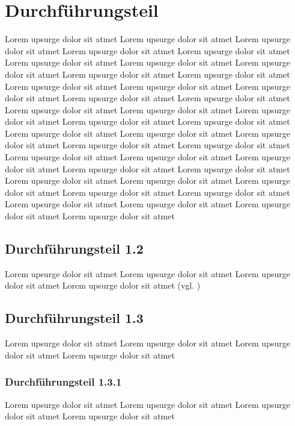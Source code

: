 \section{Durchführungsteil}

Lorem upsurge dolor sit atmet Lorem upsurge dolor sit atmet Lorem upsurge dolor sit atmet Lorem upsurge dolor sit atmet Lorem upsurge dolor sit atmet Lorem upsurge dolor sit atmet Lorem upsurge dolor sit atmet Lorem upsurge dolor sit atmet Lorem upsurge dolor sit atmet Lorem upsurge dolor sit atmet Lorem upsurge dolor sit atmet Lorem upsurge dolor sit atmet Lorem upsurge dolor sit atmet Lorem upsurge dolor sit atmet Lorem upsurge dolor sit atmet Lorem upsurge dolor sit atmet Lorem upsurge dolor sit atmet Lorem upsurge dolor sit atmet Lorem upsurge dolor sit atmet Lorem upsurge dolor sit atmet Lorem upsurge dolor sit atmet Lorem upsurge dolor sit atmet Lorem upsurge dolor sit atmet Lorem upsurge dolor sit atmet Lorem upsurge dolor sit atmet Lorem upsurge dolor sit atmet Lorem upsurge dolor sit atmet Lorem upsurge dolor sit atmet Lorem upsurge dolor sit atmet Lorem upsurge dolor sit atmet Lorem upsurge dolor sit atmet Lorem upsurge dolor sit atmet Lorem upsurge dolor sit atmet Lorem upsurge dolor sit atmet Lorem upsurge dolor sit atmet Lorem upsurge dolor sit atmet Lorem upsurge dolor sit atmet Lorem upsurge dolor sit atmet Lorem upsurge dolor sit atmet 

\subsection{Durchführungsteil 1.2}
Lorem upsurge dolor sit atmet Lorem upsurge dolor sit atmet Lorem upsurge dolor sit atmet Lorem upsurge dolor sit atmet (vgl. \cite{samplebook})
\subsection{Durchführungsteil 1.3}
Lorem upsurge dolor sit atmet Lorem upsurge dolor sit atmet Lorem upsurge dolor sit atmet Lorem upsurge dolor sit atmet \parencite[S. 55]{sample:2}
\subsubsection{Durchführungsteil 1.3.1}
Lorem upsurge dolor sit atmet Lorem upsurge dolor sit atmet Lorem upsurge dolor sit atmet Lorem upsurge dolor sit atmet \parencite{samplesite:2021}
